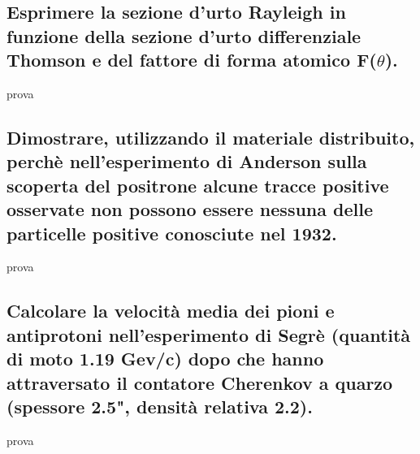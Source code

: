 \subsection[]{Esprimere la sezione d'urto Rayleigh in funzione della sezione d'urto differenziale Thomson e del fattore di forma atomico F($\theta$).
}prova
\label{sec:4.b.24}
\subsection[]{Dimostrare, utilizzando il materiale distribuito, perchè nell’esperimento di Anderson sulla scoperta del positrone alcune tracce positive osservate non
possono essere nessuna delle particelle positive conosciute nel 1932.
}prova
\label{sec:4.b.25}
\subsection[]{Calcolare la velocità media dei pioni e antiprotoni nell'esperimento di Segrè (quantità di moto 1.19 Gev/c) dopo che hanno attraversato il contatore Cherenkov a quarzo (spessore 2.5", densità relativa 2.2).
}prova
\label{sec:4.b.26}
